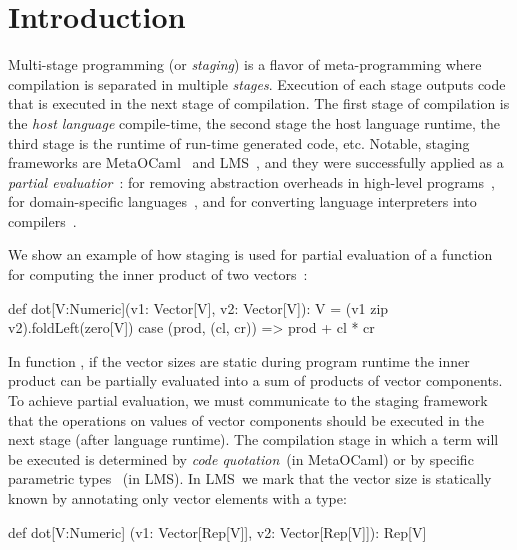 \section{Introduction}
\label{sct:introduction}


 Multi-stage programming (or \emph{staging}) is a flavor of meta-programming
  where compilation is separated in multiple \emph{stages}. Execution of each
  stage outputs code that is executed in the next stage of compilation. The first
  stage of compilation is the \emph{host language} compile-time, the second stage
  the host language runtime, the third stage is the runtime of run-time generated
  code, etc. Notable, staging frameworks are MetaOCaml~\cite{taha_multi-stage_1997}
  and LMS~\cite{rompf2012lightweight}, and they were successfully applied as a
  \emph{partial evaluatior}~\cite{jones1993partial}: for removing abstraction
  overheads in high-level programs~\cite{carette2005multi,rompf2012lightweight},
  for domain-specific languages~\cite{jonnalagedda2014staged}, and for converting language
  interpreters into compilers~\cite{lancet,futamura1999partial}.

 We show an example of how staging is used for partial evaluation of a function
 for computing the inner product of two vectors~\footnotemark[1]:\begin{lstparagraph}
def dot[V:Numeric](v1: Vector[V], v2: Vector[V]): V =
  (v1 zip v2).foldLeft(zero[V]) {
    case (prod, (cl, cr)) => prod + cl * cr
  }
 \end{lstparagraph}

In function , if the vector sizes are static during program runtime the inner product can
 be partially evaluated into a sum of products of vector components. To achieve partial evaluation,
 we must communicate to the staging framework that the operations on values of vector components
 should be executed in the next stage (after language runtime). The compilation stage
 in which a term will be executed is determined by \emph{code quotation}~(in MetaOCaml)
 or by specific parametric types ~(in LMS). In LMS~\footnotemark[2] we mark
 that the vector size is statically known by annotating only vector elements with
 a  type:\begin{lstparagraph}
def dot[V:Numeric]
  (v1: Vector[Rep[V]], v2: Vector[Rep[V]]): Rep[V]
 \end{lstparagraph}

